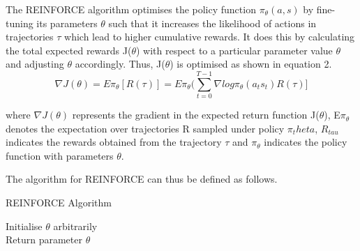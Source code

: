 \documentclass{article}
\begin{document}
\par The REINFORCE algorithm optimises the policy function $\pi_{\theta}(a,s)$ by fine-tuning its parameters $\theta$ such that it increases the likelihood of actions in trajectories $\tau$ which lead to higher cumulative rewards. It does this by calculating the total expected rewards J($\theta$) with respect to a particular parameter value $\theta$ and adjusting $\theta$ accordingly. Thus, J($\theta$) is optimised as shown in equation 2.
\begin{equation}
\nabla J(\theta) = E\pi_\theta[ R(\tau)] =   E\pi_\theta (\sum_{t=0}^{T-1} \nabla log\pi_\theta(a_t s_t) R(\tau)]
\end{equation}

where $\nabla J(\theta)$ represents the gradient in the expected return function J($\theta$), E$\pi_\theta$ denotes the expectation over trajectories R sampled under policy $\pi_theta$, $R_{tau}$ indicates the rewards obtained from the trajectory $\tau$ and $\pi_\theta$ indicates the policy function with parameters $\theta$.  \newline

The algorithm for REINFORCE can thus be defined as follows. 
\begin{algorithm}[htbp]
\caption{REINFORCE Algorithm}
\SetAlgoLined
\DontPrintSemicolon
\small %
Initialise $\theta$ arbitrarily\;\\
Return parameter $\theta$
\end{algorithm}
\end{document}
